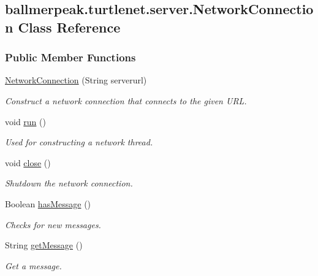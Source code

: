 \hypertarget{classballmerpeak_1_1turtlenet_1_1server_1_1NetworkConnection}{\subsection{ballmerpeak.\-turtlenet.\-server.\-Network\-Connection Class Reference}
\label{classballmerpeak_1_1turtlenet_1_1server_1_1NetworkConnection}
}
\subsubsection*{Public Member Functions}
\begin{DoxyCompactItemize}
\item 
\hyperlink{classballmerpeak_1_1turtlenet_1_1server_1_1NetworkConnection_ae7c0317cc0fa85bc885799436affb5e6}{Network\-Connection} (String serverurl)
\begin{DoxyCompactList}\small\item\em Construct a network connection that connects to the given U\-R\-L. \end{DoxyCompactList}\item 
void \hyperlink{classballmerpeak_1_1turtlenet_1_1server_1_1NetworkConnection_a44b870f7d418ce3ab69587e94ce32a74}{run} ()
\begin{DoxyCompactList}\small\item\em Used for constructing a network thread. \end{DoxyCompactList}\item 
void \hyperlink{classballmerpeak_1_1turtlenet_1_1server_1_1NetworkConnection_a1bb312cc4af1b95710ecd9b65c5215ce}{close} ()
\begin{DoxyCompactList}\small\item\em Shutdown the network connection. \end{DoxyCompactList}\item 
Boolean \hyperlink{classballmerpeak_1_1turtlenet_1_1server_1_1NetworkConnection_aadf8e9595cea4dadbb82355e58ba72ec}{has\-Message} ()
\begin{DoxyCompactList}\small\item\em Checks for new messages. \end{DoxyCompactList}\item 
String \hyperlink{classballmerpeak_1_1turtlenet_1_1server_1_1NetworkConnection_a5b9adc8fa4dee623cc1d1c33ccaa7846}{get\-Message} ()
\begin{DoxyCompactList}\small\item\em Get a message. \end{DoxyCompactList}\item 

\end{DoxyCompactItemize}
